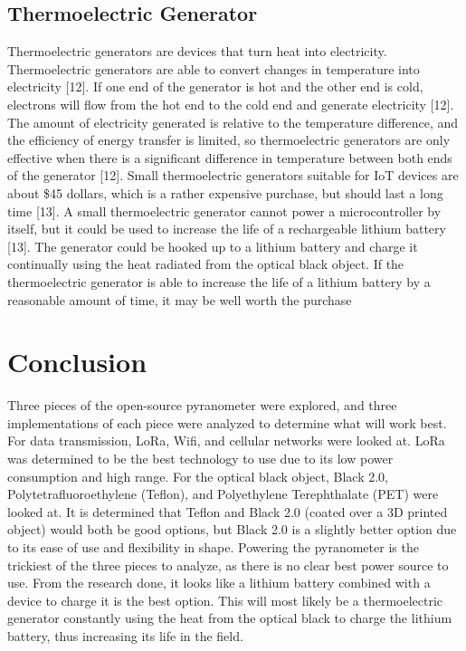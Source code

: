 \documentclass[10pt,draftclsnofoot,onecolumn,letterpaper]{article}
\begin{document}
\subsection{Thermoelectric Generator}
Thermoelectric generators are devices that turn heat into electricity. Thermoelectric generators are able to convert changes in temperature into electricity [12]. If one end of the generator is hot and the other end is cold, electrons will flow from the hot end to the cold end and generate electricity [12]. The amount of electricity generated is relative to the temperature difference, and the efficiency of energy transfer is limited, so thermoelectric generators are only effective when there is a significant difference in temperature between both ends of the generator [12]. Small thermoelectric generators suitable for IoT devices are about \$45 dollars, which is a rather expensive purchase, but should last a long time [13]. A small thermoelectric generator cannot power a microcontroller by itself, but it could be used to increase the life of a rechargeable lithium battery [13]. The generator could be hooked up to a lithium battery and charge it continually using the heat radiated from the optical black object. If the thermoelectric generator is able to increase the life of a lithium battery by a reasonable amount of time, it may be well worth the purchase

\section{Conclusion}
Three pieces of the open-source pyranometer were explored, and three implementations of each piece were analyzed to determine what will work best. For data transmission, LoRa, Wifi, and cellular networks were looked at. LoRa was determined to be the best technology to use due to its low power consumption and high range. For the optical black object, Black 2.0, Polytetrafluoroethylene (Teflon), and Polyethylene Terephthalate (PET) were looked at. It is determined that Teflon and Black 2.0 (coated over a 3D printed object) would both be good options, but Black 2.0 is a slightly better option due to its ease of use and flexibility in shape. Powering the pyranometer is the trickiest of the three pieces to analyze, as there is no clear best power source to use. From the research done, it looks like a lithium battery combined with a device to charge it is the best option. This will most likely be a thermoelectric generator constantly using the heat from the optical black to charge the lithium battery, thus increasing its life in the field.
\end{document}
